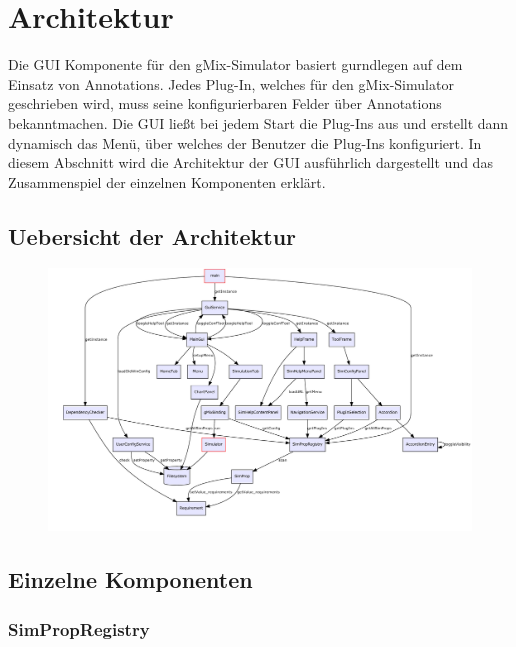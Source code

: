 \documentclass[a4paper, 11pt]{article} %
\begin{document}

\section{Architektur} %
\label{sec:architektur}
Die GUI Komponente für den gMix-Simulator basiert gurndlegen auf dem Einsatz von Annotations. Jedes Plug-In, welches für den gMix-Simulator geschrieben wird, muss seine konfigurierbaren Felder über Annotations bekanntmachen. Die GUI ließt bei jedem Start die Plug-Ins aus und erstellt dann dynamisch das Menü, über welches der Benutzer die Plug-Ins konfiguriert. In diesem Abschnitt wird die Architektur der GUI ausführlich dargestellt und das Zusammenspiel der einzelnen Komponenten erklärt.

\subsection{Uebersicht der Architektur} %
\label{ssub:uebersicht}

\begin{figure}
\includegraphics[width=\textwidth]{dot/arch}
\end{figure}


\subsection{Einzelne Komponenten} %
\label{ssub:einzelne_komponenten}

\subsubsection{SimPropRegistry}
\label{sssub:simpropregistry}
\end{document}
